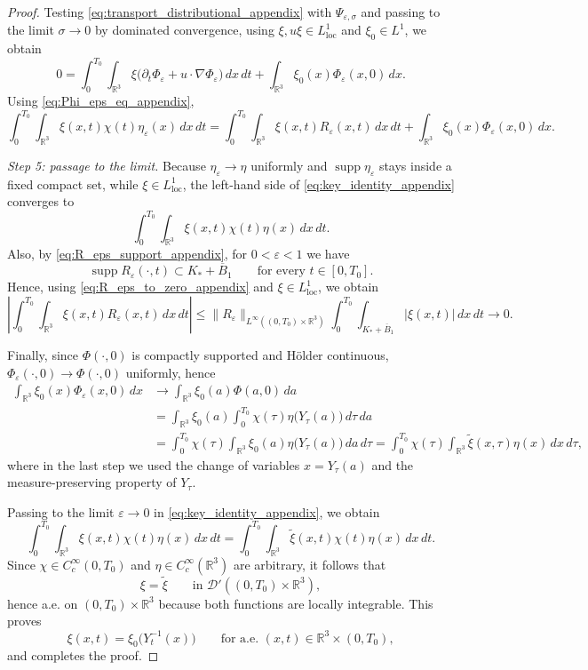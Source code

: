 \documentclass[reqno,11pt]{amsart}
\newcommand{\supp}{\operatorname{supp}}
\begin{document}
\begin{proof}
Testing \eqref{eq:transport_distributional_appendix} with
$\Psi_{\varepsilon,\sigma}$ and passing to the limit $\sigma\to0$ by dominated convergence,
using $\xi,u\xi\in L^1_{\mathrm{loc}}$ and $\xi_0\in L^1$, we obtain
\[
0=
\int_0^{T_0}\int_{\mathbb R^3}
\xi\bigl(\partial_t\Phi_\varepsilon+u\cdot\nabla\Phi_\varepsilon\bigr)\,dx\,dt
+\int_{\mathbb R^3}\xi_0(x)\Phi_\varepsilon(x,0)\,dx .
\]
Using \eqref{eq:Phi_eps_eq_appendix},
\begin{equation}
\label{eq:key_identity_appendix}
\int_0^{T_0}\int_{\mathbb R^3}\xi(x,t)\chi(t)\eta_\varepsilon(x)\,dx\,dt
=
\int_0^{T_0}\int_{\mathbb R^3}\xi(x,t)R_\varepsilon(x,t)\,dx\,dt
+\int_{\mathbb R^3}\xi_0(x)\Phi_\varepsilon(x,0)\,dx .
\end{equation}


\smallskip
\noindent\emph{Step 5: passage to the limit.}
Because $\eta_\varepsilon\to\eta$ uniformly and $\operatorname{supp}\eta_\varepsilon$ stays
inside a fixed compact set, while $\xi\in L^1_{\mathrm{loc}}$, the left-hand side of
\eqref{eq:key_identity_appendix} converges to
\[
\int_0^{T_0}\int_{\mathbb R^3}\xi(x,t)\chi(t)\eta(x)\,dx\,dt.
\]
Also, by \eqref{eq:R_eps_support_appendix}, for $0<\varepsilon<1$ we have
\[
\supp R_\varepsilon(\cdot,t)\subset K_*+\overline B_1
\qquad\text{for every }t\in[0,T_0].
\]
Hence, using \eqref{eq:R_eps_to_zero_appendix} and $\xi\in L^1_{\mathrm{loc}}$, we obtain
\[
\left|
\int_0^{T_0}\int_{\mathbb R^3}\xi(x,t)R_\varepsilon(x,t)\,dx\,dt
\right|
\le
\|R_\varepsilon\|_{L^\infty((0,T_0)\times\mathbb R^3)}
\int_0^{T_0}\int_{K_*+\overline B_1}|\xi(x,t)|\,dx\,dt
\longrightarrow 0.
\]


Finally, since $\Phi(\cdot,0)$ is compactly supported and H\"older continuous,
$\Phi_\varepsilon(\cdot,0)\to\Phi(\cdot,0)$ uniformly, hence
\begin{align*}
\int_{\mathbb R^3}\xi_0(x)\Phi_\varepsilon(x,0)\,dx
&\longrightarrow
\int_{\mathbb R^3}\xi_0(a)\Phi(a,0)\,da \\
&=
\int_{\mathbb R^3}\xi_0(a)\int_0^{T_0}\chi(\tau)\eta\big(Y_\tau(a)\big)\,d\tau\,da \\
&=
\int_0^{T_0}\chi(\tau)\int_{\mathbb R^3}\xi_0(a)\eta\big(Y_\tau(a)\big)\,da\,d\tau 
=
\int_0^{T_0}\chi(\tau)\int_{\mathbb R^3}\widetilde{\xi}(x,\tau)\eta(x)\,dx\,d\tau,
\end{align*}
where in the last step we used the change of variables $x=Y_\tau(a)$ and the
measure-preserving property of $Y_\tau$.

Passing to the limit $\varepsilon\to0$ in \eqref{eq:key_identity_appendix}, we obtain
\[
\int_0^{T_0}\int_{\mathbb R^3}\xi(x,t)\chi(t)\eta(x)\,dx\,dt
=
\int_0^{T_0}\int_{\mathbb R^3}\widetilde{\xi}(x,t)\chi(t)\eta(x)\,dx\,dt.
\]
Since $\chi\in C_c^\infty(0,T_0)$ and $\eta\in C_c^\infty(\mathbb R^3)$ are arbitrary,
it follows that
\[
\xi=\widetilde{\xi}
\qquad\text{in }\mathcal D'((0,T_0)\times\mathbb R^3),
\]
hence a.e. on $(0,T_0)\times\mathbb R^3$ because both functions are locally integrable.
This proves
\[
\xi(x,t)=\xi_0\bigl(Y_t^{-1}(x)\bigr)
\qquad\text{for a.e. }(x,t)\in\mathbb R^3\times(0,T_0),
\]
and completes the proof.
\end{proof}
\end{document}
